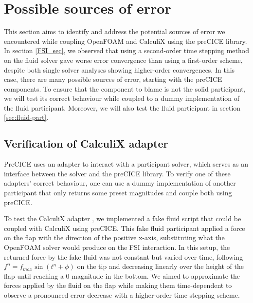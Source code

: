 \documentclass[
  english,        %
  font=times,     %
  onecolumn,      %
]{tumarticle}
\begin{document}
\section{Possible sources of error}
This section aims to identify and address the potential sources of error we encountered while coupling OpenFOAM and CalculiX using the preCICE library. In section \ref{FSI_sec}, we observed that using a second-order time stepping method on the fluid solver gave worse error convergence than using a first-order scheme, despite both single solver analyses showing higher-order convergences. In this case, there are many possible sources of error, starting with the preCICE components. To ensure that the component to blame is not the solid participant, we will test its correct behaviour while coupled to a dummy implementation of the fluid participant. Moreover, we will also test the fluid participant in section \ref{sec:fluid-part}.


\subsection{Verification of CalculiX adapter}
PreCICE uses an adapter to interact with a participant solver, which serves as an interface between the solver and the preCICE library. To verify one of these adapters' correct behaviour, one can use a dummy implementation of another participant that only returns some preset magnitudes and couple both using preCICE.

To test the CalculiX adapter \cite{yau2016conjugate}, we implemented a fake fluid script that could be coupled with CalculiX using preCICE. This fake fluid \cite{pullrequestfake-fluid} participant applied a force on the flap with the direction of the positive x-axis, substituting what the OpenFOAM solver would produce on the FSI interaction. In this setup, the returned force by the fake fluid was not constant but varied over time, following $f^n = f_{max} \sin(t^n + \phi)$ on the tip and decreasing linearly over the height of the flap until reaching a 0 magnitude in the bottom. We aimed to approximate the forces applied by the fluid on the flap while making them time-dependent to observe a pronounced error decrease with a higher-order time stepping scheme.
\end{document}
